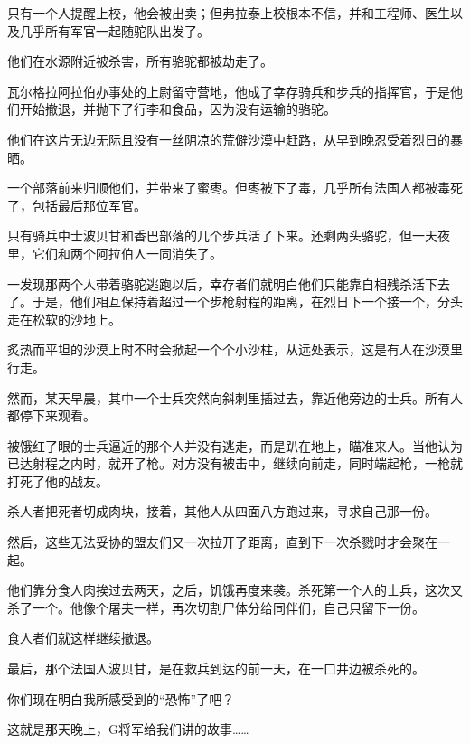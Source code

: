 \documentclass{article}
\begin{document}
只有一个人提醒上校，他会被出卖；但弗拉泰上校根本不信，并和工程师、医生以及几乎所有军官一起随驼队出发了。



他们在水源附近被杀害，所有骆驼都被劫走了。



瓦尔格拉阿拉伯办事处的上尉留守营地，他成了幸存骑兵和步兵的指挥官，于是他们开始撤退，并抛下了行李和食品，因为没有运输的骆驼。



他们在这片无边无际且没有一丝阴凉的荒僻沙漠中赶路，从早到晚忍受着烈日的暴晒。



一个部落前来归顺他们，并带来了蜜枣。但枣被下了毒，几乎所有法国人都被毒死了，包括最后那位军官。



只有骑兵中士波贝甘和香巴部落的几个步兵活了下来。还剩两头骆驼，但一天夜里，它们和两个阿拉伯人一同消失了。



一发现那两个人带着骆驼逃跑以后，幸存者们就明白他们只能靠自相残杀活下去了。于是，他们相互保持着超过一个步枪射程的距离，在烈日下一个接一个，分头走在松软的沙地上。



炙热而平坦的沙漠上时不时会掀起一个个小沙柱，从远处表示，这是有人在沙漠里行走。



然而，某天早晨，其中一个士兵突然向斜刺里插过去，靠近他旁边的士兵。所有人都停下来观看。



被饿红了眼的士兵逼近的那个人并没有逃走，而是趴在地上，瞄准来人。当他认为已达射程之内时，就开了枪。对方没有被击中，继续向前走，同时端起枪，一枪就打死了他的战友。



杀人者把死者切成肉块，接着，其他人从四面八方跑过来，寻求自己那一份。



然后，这些无法妥协的盟友们又一次拉开了距离，直到下一次杀戮时才会聚在一起。



他们靠分食人肉挨过去两天，之后，饥饿再度来袭。杀死第一个人的士兵，这次又杀了一个。他像个屠夫一样，再次切割尸体分给同伴们，自己只留下一份。



食人者们就这样继续撤退。



最后，那个法国人波贝甘，是在救兵到达的前一天，在一口井边被杀死的。



你们现在明白我所感受到的“恐怖”了吧？



这就是那天晚上，G将军给我们讲的故事……
\end{document}
